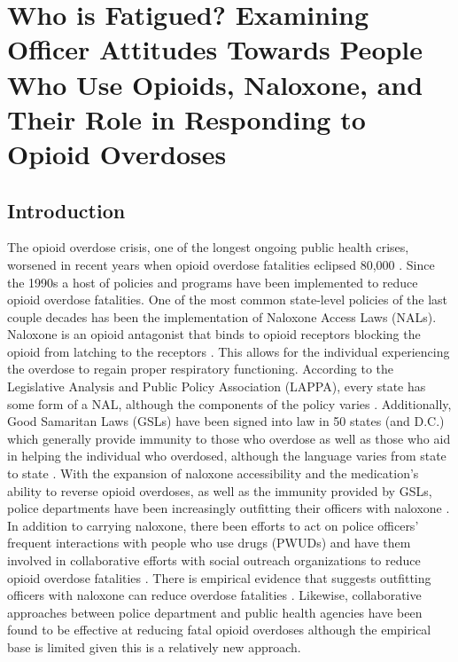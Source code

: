 \chapter{Who is Fatigued? Examining Officer Attitudes Towards People Who Use Opioids, Naloxone, and Their Role in Responding to Opioid Overdoses}

\section{Introduction}

The opioid overdose crisis, one of the longest ongoing public health crises, worsened in recent years when opioid overdose fatalities eclipsed 80,000 \parencite{center_for_disease_control_and_prevention_national_2023}. Since the 1990s a host of policies and programs have been implemented to reduce opioid overdose fatalities. One of the most common state-level policies of the last couple decades has been the implementation of Naloxone Access Laws (NALs). Naloxone is an opioid antagonist that binds to opioid receptors blocking the opioid from latching to the receptors \parencite{lurigio_opioid_2018}. This allows for the individual experiencing the overdose to regain proper respiratory functioning. According to the Legislative Analysis and Public Policy Association (LAPPA), every state has some form of a NAL, although the components of the policy varies \parencite{legislative_analysis_and_public_policy_association_naloxone_2022}. Additionally, Good Samaritan Laws (GSLs) have been signed into law in 50 states (and D.C.) which generally provide immunity to those who overdose as well as those who aid in helping the individual who overdosed, although the language varies from state to state \parencite{west_good_2023}. With the expansion of naloxone accessibility and the medication's ability to reverse opioid overdoses, as well as the immunity provided by GSLs, police departments have been increasingly outfitting their officers with naloxone \parencite{lurigio_opioid_2018}. In addition to carrying naloxone, there been efforts to act on police officers' frequent interactions with people who use drugs (PWUDs) and have them involved in collaborative efforts with social outreach organizations to reduce opioid overdose fatalities \parencite{donnelly_law_2022, formica_characteristics_2021, yatsco_alternatives_2020}. There is empirical evidence that suggests outfitting officers with naloxone can reduce overdose fatalities \parencite{rando_intranasal_2015}. Likewise, collaborative approaches between police department and public health agencies have been found to be effective at reducing fatal opioid overdoses \parencite{donnelly_law_2022} although the empirical base is limited given this is a relatively new approach.

